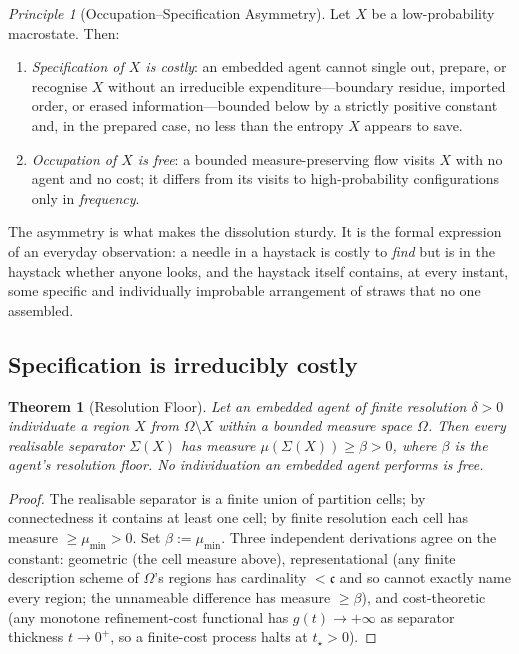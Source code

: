 \documentclass[twocolumn,10pt,a4paper]{article}
\theoremstyle{thmstyle}
\newtheorem{theorem}{Theorem}[section]
\theoremstyle{definition}
\theoremstyle{remark}
\newtheorem{principle}{Principle}
\begin{document}
\begin{principle}[Occupation--Specification Asymmetry]
\label{prin:asym}
Let $X$ be a low-probability macrostate. Then:
\begin{enumerate}[nosep,leftmargin=*]
\item \emph{Specification of $X$ is costly}: an embedded agent cannot
single out, prepare, or recognise $X$ without an irreducible
expenditure---boundary residue, imported order, or erased
information---bounded below by a strictly positive constant and, in
the prepared case, no less than the entropy $X$ appears to save.
\item \emph{Occupation of $X$ is free}: a bounded measure-preserving
flow visits $X$ with no agent and no cost; it differs from its visits
to high-probability configurations only in \emph{frequency}.
\end{enumerate}
\end{principle}

The asymmetry is what makes the dissolution sturdy. It is the formal
expression of an everyday observation: a needle in a haystack is
costly to \emph{find} but is in the haystack whether anyone looks,
and the haystack itself contains, at every instant, some specific
and individually improbable arrangement of straws that no one
assembled.

\subsection{Specification is irreducibly costly}

\begin{theorem}[Resolution Floor]
\label{thm:floor}
Let an embedded agent of finite resolution $\delta>0$ individuate a
region $X$ from $\Omega\setminus X$ within a bounded measure space
$\Omega$. Then every realisable separator $\Sigma(X)$ has measure
$\mu(\Sigma(X))\geq\beta>0$, where $\beta$ is the agent's
\emph{resolution floor}. No individuation an embedded agent performs
is free.
\end{theorem}

\begin{proof}
The realisable separator is a finite union of partition cells; by
connectedness it contains at least one cell; by finite resolution
each cell has measure $\geq\mu_{\min}>0$. Set
$\beta:=\mu_{\min}$. Three independent derivations agree on the
constant: geometric (the cell measure above), representational
(any finite description scheme of $\Omega$'s regions has cardinality
$<\mathfrak{c}$ and so cannot exactly name every region; the
unnameable difference has measure $\geq\beta$), and cost-theoretic
(any monotone refinement-cost functional has
$g(t)\to+\infty$ as separator thickness $t\to 0^{+}$, so a
finite-cost process halts at $t_{\star}>0$).
\end{proof}
\end{document}
